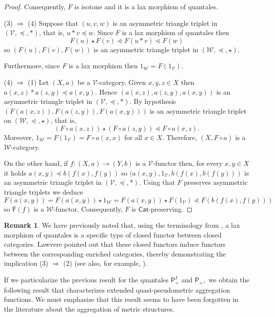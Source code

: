 \documentclass[11pt,a4paper]{amsart}
\theoremstyle{definition}
\newtheorem{remark}[theorem]{Remark}
\begin{document}
\begin{proof}
		Consequently, $F$ is isotone and it is a lax morphism of quantales.\medskip
		
		\noindent	(3) $\Rightarrow$ (4)
		Suppose that $(u,v,w)$ is an asymmetric triangle triplet in $(\mathscr{V},\preceq,\ast)$, that is, $u\ast v\preceq w.$ Since $F$ is a lax morphism of quantales then
		$$F(u)\star F(v)\curlyeqprec F(u\ast v)\curlyeqprec F(w)$$
		so $(F(u),F(v),F(w))$ is an asymmetric triangle triplet in $(\mathscr{W},\curlyeqprec,\star).$
		
		Furthermore, since $F$ is a lax morphism then $1_\mathscr{W}=F(1_{\mathscr{V}}).$
		
		
		\medskip
		
		
		\noindent	(4) $\Rightarrow$ (1)
		Let $(X,a)$ be a $\mathscr{V}$-category. Given $x,y,z\in X$ then $a(x,z)\ast a(z,y)\preceq a(x,y)$. Hence $(a(x,z),a(z,y),a(x,y))$ is an asymmetric triangle triplet in $(\mathscr{V},\preceq,\ast)$. By hypothesis $(F(a(x,z)),F(a(z,y)),F(a(x,y)))$ is an asymmetric triangle triplet on $(\mathscr{W},\curlyeqprec,\star)$, that is,
		$$(F\circ a(x,z))\star (F\circ a(z,y))\curlyeqprec F\circ a(x,z).$$
		Moreover, $1_\mathscr{W}= F(1_\mathscr{V})=F\circ a(x,x)$ for all $x\in X.$ Therefore, $(X,F\circ a)$ is a $\mathscr{W}$-category.
		
		On the other hand, if $f:(X,a)\to (Y,b)$ is a $\mathscr{V}$-functor then, for every $x,y\in X$ it holds $a(x,y)\preceq b(f(x),f(y))$ so $(a(x,y),1_\mathscr{V},b(f(x),b(f(y)))$ is an asymmetric triangle triplet in $(\mathscr{V},\preceq,\ast)$. Using that $F$ preserves asymmetric triangle triplets we deduce
		$$F(a(x,y))=F(a(x,y))\star 1_\mathscr{W}= F(a(x,y))\star F(1_\mathscr{V})\curlyeqprec F(b(f(x),f(y)))$$ so $\mathsf{F}(f)$ is a $\mathscr{W}$-functor. Consequently, $F$ is $\mathsf{Cat}$-preserving.
	\end{proof}
	
	\begin{remark}
		We have previously noted that, using the terminology from \cite{Lawv73}, a lax morphism of quantales is a specific type of closed functor between closed categories. Lawvere pointed out \cite[p. 149]{Lawv73} that these closed functors induce functors between the corresponding enriched categories, thereby demonstrating the implication (3) $\Rightarrow$ (2) (see also, for example, \cite{HofReis13}).
	\end{remark}
	
	
	If we particularize the previous result for the quantales $\mathsf{P}_+^I$ and $\mathsf{P}_+,$ we obtain the following result that characterizes extended quasi-pseudometric aggregation functions. We must emphasize that this result seems to have been forgotten in the literature about the aggregation of metric structures.
	
\end{document}
